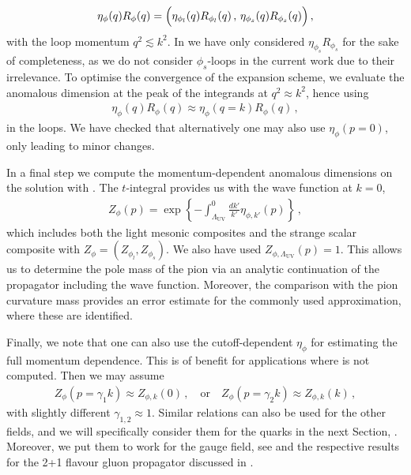 \documentclass[aps,twocolumn,prd,superscriptaddress]{revtex4-2}
\begin{document}
%
\begin{align}
\eta_{\phi}(q) R_\phi(q)= \Bigl( \eta_{\phi_l}(q) R_{\phi_l}(q)\,,\, \eta_{\phi_s}(q) R_{\phi_s}(q)\Bigr) \,,
\label{eq:etaR}
\end{align}
%
with the loop momentum $q^2\lesssim k^2$. In  we have only considered $\eta_{\phi_s} R_{\phi_s}$ for the sake of completeness, as we do not consider $\phi_s$-loops in the current work due to their irrelevance. To optimise the convergence of the expansion scheme, we evaluate the anomalous dimension at the peak of the integrands at $q^2\approx k^2$, hence using 
%
\begin{align} \label{eq:loopapprox}
	\eta_{\phi}(q) R_\phi(q) \approx \eta_{\phi}(q=k) R_{\phi}(q)\,,
\end{align}
% 
in the loops. We have checked that alternatively one may also use $\eta_{\phi}(p=0)$, only leading to minor changes. 

In a final step we compute the momentum-dependent anomalous dimensions on the solution with .
%
The $t$-integral provides us with the wave function at $k=0$, 
%
\begin{align}
	Z_\phi(p) = \exp\left\{- \int_{\Lambda_\textrm{UV}}^0 \frac{d k'}{k'} \eta_{\phi,k'}(p)\right\}\,,
	\label{eq:Zphip}
\end{align} 
%
which includes both the light mesonic composites and the strange scalar composite with $Z_\phi=(Z_{\phi_l},Z_{\phi_s})$. We also have used $Z_{\phi,\Lambda_\textrm{UV}}(p) =1$. This allows us to determine the pole mass of the pion via an analytic continuation of the propagator including the wave function. Moreover, the comparison with the pion curvature mass provides an error estimate for the commonly used approximation, where these are identified. 

Finally, we note that one can also use the cutoff-dependent $\eta_{\phi}$ for estimating the full momentum dependence. This is of benefit for applications where  is not computed. Then we may assume 
%
\begin{align} 
	Z_{\phi}(p=\gamma_1 k) \approx Z_{\phi,k}(0) \,,\quad \textrm{or}\quad Z_{\phi}(p=\gamma_2 k) \approx Z_{\phi,k}(k)\,,
\label{eq:Zk-p} 
\end{align}
% 
with slightly different $\gamma_{1,2} \approx 1$. Similar relations can also be used for the other fields, and we will specifically consider them for the quarks in the next Section, . Moreover, we put them to work for the gauge field, see  and the respective results for the 2+1 flavour gluon propagator discussed in . 
\end{document}

